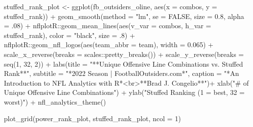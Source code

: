 \documentclass[
  letterpaper,
]{krantz}
\newenvironment{Shaded}{\begin{snugshade}}{\end{snugshade}}
\newcommand{\AttributeTok}[1]{\textcolor[rgb]{0.40,0.45,0.13}{#1}}
\newcommand{\ConstantTok}[1]{\textcolor[rgb]{0.56,0.35,0.01}{#1}}
\newcommand{\DecValTok}[1]{\textcolor[rgb]{0.68,0.00,0.00}{#1}}
\newcommand{\FloatTok}[1]{\textcolor[rgb]{0.68,0.00,0.00}{#1}}
\newcommand{\FunctionTok}[1]{\textcolor[rgb]{0.28,0.35,0.67}{#1}}
\newcommand{\NormalTok}[1]{\textcolor[rgb]{0.00,0.23,0.31}{#1}}
\newcommand{\OtherTok}[1]{\textcolor[rgb]{0.00,0.23,0.31}{#1}}
\newcommand{\SpecialCharTok}[1]{\textcolor[rgb]{0.37,0.37,0.37}{#1}}
\newcommand{\StringTok}[1]{\textcolor[rgb]{0.13,0.47,0.30}{#1}}
\begin{document}
\begin{Shaded}
\begin{Highlighting}[]
\NormalTok{stuffed\_rank\_plot }\OtherTok{\textless{}{-}} \FunctionTok{ggplot}\NormalTok{(fb\_outsiders\_oline, }\FunctionTok{aes}\NormalTok{(}\AttributeTok{x =}\NormalTok{ combos, }\AttributeTok{y =}\NormalTok{ stuffed\_rank)) }\SpecialCharTok{+}
  \FunctionTok{geom\_smooth}\NormalTok{(}\AttributeTok{method =} \StringTok{"lm"}\NormalTok{, }\AttributeTok{se =} \ConstantTok{FALSE}\NormalTok{, }\AttributeTok{size =} \FloatTok{0.8}\NormalTok{, }\AttributeTok{alpha =}\NormalTok{ .}\DecValTok{08}\NormalTok{) }\SpecialCharTok{+}
\NormalTok{  nflplotR}\SpecialCharTok{::}\FunctionTok{geom\_mean\_lines}\NormalTok{(}\FunctionTok{aes}\NormalTok{(}\AttributeTok{v\_var =}\NormalTok{ combos, }\AttributeTok{h\_var =}\NormalTok{ stuffed\_rank),}
                            \AttributeTok{color =} \StringTok{"black"}\NormalTok{,}
                            \AttributeTok{size =}\NormalTok{ .}\DecValTok{8}\NormalTok{) }\SpecialCharTok{+}
\NormalTok{  nflplotR}\SpecialCharTok{::}\FunctionTok{geom\_nfl\_logos}\NormalTok{(}\FunctionTok{aes}\NormalTok{(}\AttributeTok{team\_abbr =}\NormalTok{ team), }\AttributeTok{width =} \FloatTok{0.065}\NormalTok{) }\SpecialCharTok{+}
  \FunctionTok{scale\_x\_reverse}\NormalTok{(}\AttributeTok{breaks =}\NormalTok{ scales}\SpecialCharTok{::}\FunctionTok{pretty\_breaks}\NormalTok{()) }\SpecialCharTok{+}
  \FunctionTok{scale\_y\_reverse}\NormalTok{(}\AttributeTok{breaks =} \FunctionTok{seq}\NormalTok{(}\DecValTok{1}\NormalTok{, }\DecValTok{32}\NormalTok{, }\DecValTok{2}\NormalTok{)) }\SpecialCharTok{+}
  \FunctionTok{labs}\NormalTok{(}\AttributeTok{title =} \StringTok{"**Unique Offensive Line Combinations vs. Stuffed Rank**"}\NormalTok{,}
       \AttributeTok{subtitle =} \StringTok{"*2022 Season  |  FootballOutsiders.com*"}\NormalTok{,}
       \AttributeTok{caption =} \StringTok{"*An Introduction to NFL Analytics with R*\textless{}br\textgreater{}**Brad J. Congelio**"}\NormalTok{)}\SpecialCharTok{+}
  \FunctionTok{xlab}\NormalTok{(}\StringTok{"\# of Unique Offensive Line Combinations"}\NormalTok{) }\SpecialCharTok{+}
  \FunctionTok{ylab}\NormalTok{(}\StringTok{"Stuffed Ranking (1 = best, 32 = worst)"}\NormalTok{) }\SpecialCharTok{+}
  \FunctionTok{nfl\_analytics\_theme}\NormalTok{()}

\FunctionTok{plot\_grid}\NormalTok{(power\_rank\_plot, stuffed\_rank\_plot, }\AttributeTok{ncol =} \DecValTok{1}\NormalTok{)}
\end{Highlighting}
\end{Shaded}
\end{document}
